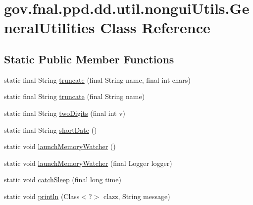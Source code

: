 \hypertarget{classgov_1_1fnal_1_1ppd_1_1dd_1_1util_1_1nonguiUtils_1_1GeneralUtilities}{\section{gov.\-fnal.\-ppd.\-dd.\-util.\-nongui\-Utils.\-General\-Utilities Class Reference}
\label{classgov_1_1fnal_1_1ppd_1_1dd_1_1util_1_1nonguiUtils_1_1GeneralUtilities}
}
\subsection*{Static Public Member Functions}
\begin{DoxyCompactItemize}
\item 
static final String \hyperlink{classgov_1_1fnal_1_1ppd_1_1dd_1_1util_1_1nonguiUtils_1_1GeneralUtilities_ac0fbe7f166c44d0db945ce9ae66d79ad}{truncate} (final String name, final int chars)
\item 
static final String \hyperlink{classgov_1_1fnal_1_1ppd_1_1dd_1_1util_1_1nonguiUtils_1_1GeneralUtilities_a388dcd9586e091a5fe290f9ed2cb81d5}{truncate} (final String name)
\item 
static final String \hyperlink{classgov_1_1fnal_1_1ppd_1_1dd_1_1util_1_1nonguiUtils_1_1GeneralUtilities_a4b0a62f165274e692d9bcd99c21c23fa}{two\-Digits} (final int v)
\item 
static final String \hyperlink{classgov_1_1fnal_1_1ppd_1_1dd_1_1util_1_1nonguiUtils_1_1GeneralUtilities_adac619e2acf170eb5d0a00dfe1f9b8d8}{short\-Date} ()
\item 
static void \hyperlink{classgov_1_1fnal_1_1ppd_1_1dd_1_1util_1_1nonguiUtils_1_1GeneralUtilities_a572f6d7db4204737435a39c1457d4480}{launch\-Memory\-Watcher} ()
\item 
static void \hyperlink{classgov_1_1fnal_1_1ppd_1_1dd_1_1util_1_1nonguiUtils_1_1GeneralUtilities_a8c23cc2e0f360c1ec8edf7301790a7a9}{launch\-Memory\-Watcher} (final Logger logger)
\item 
static void \hyperlink{classgov_1_1fnal_1_1ppd_1_1dd_1_1util_1_1nonguiUtils_1_1GeneralUtilities_a659fea65836f77255e47394f3ccdd411}{catch\-Sleep} (final long time)
\item 
static void \hyperlink{classgov_1_1fnal_1_1ppd_1_1dd_1_1util_1_1nonguiUtils_1_1GeneralUtilities_ab1ab6769cdb085fc17a48195da426c81}{println} (Class$<$?$>$ clazz, String message)
\item 

\end{DoxyCompactItemize}
